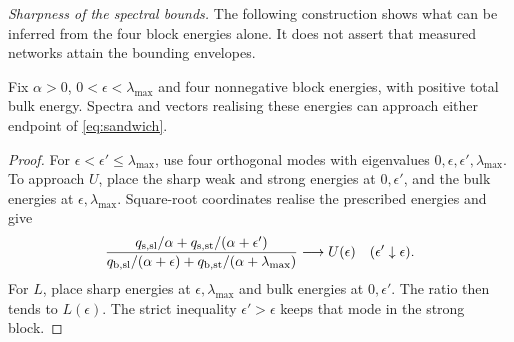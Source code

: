 \emph{Sharpness of the spectral bounds.}\label{app:sharpness}
The following construction shows what can be inferred from the four block energies alone.
It does not assert that measured networks attain the bounding envelopes.

\begin{proposition}[Sharpness]\label{prop:sharp}
Fix $\alpha>0$, $0<\epsilon<\lambda_{\max}$ and four nonnegative block energies,
with positive total bulk energy. Spectra and vectors realising these energies can
approach either endpoint of \eqref{eq:sandwich}.
\end{proposition}
\begin{proof}
For $\epsilon<\epsilon'\le\lambda_{\max}$, use four orthogonal modes with eigenvalues
$0,\epsilon,\epsilon',\lambda_{\max}$. To approach $U$, place the sharp weak and
strong energies at $0,\epsilon'$, and the bulk energies at $\epsilon,\lambda_{\max}$.
Square-root coordinates realise the prescribed energies and give
\[
 \frac{q_{\mathrm{s},\rm sl}/\alpha+q_{\mathrm{s},\rm st}/(\alpha+\epsilon')}
      {q_{\mathrm{b},\rm sl}/(\alpha+\epsilon)+q_{\mathrm{b},\rm st}/(\alpha+\lambda_{\max})}
 \longrightarrow U(\epsilon)\quad(\epsilon'\downarrow\epsilon).
\]
For $L$, place sharp energies at $\epsilon,\lambda_{\max}$ and bulk energies at
$0,\epsilon'$. The ratio then tends to $L(\epsilon)$. The strict inequality
$\epsilon'>\epsilon$ keeps that mode in the strong block.
\end{proof}
